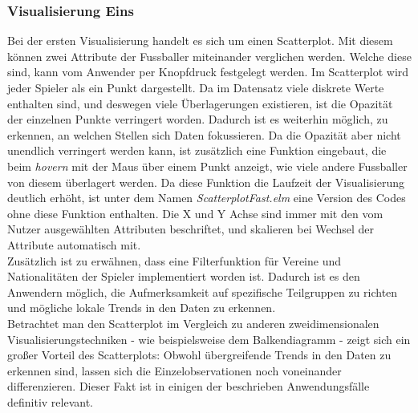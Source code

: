 \documentclass[usegeometry=true]{scrartcl}
\begin{document}
\subsubsection{Visualisierung Eins}
Bei der ersten Visualisierung handelt es sich um einen Scatterplot.
Mit diesem können zwei Attribute der Fussballer miteinander verglichen werden. Welche diese sind, kann vom Anwender per Knopfdruck festgelegt werden. Im Scatterplot wird jeder Spieler als ein Punkt dargestellt. Da im Datensatz viele diskrete Werte enthalten sind, und deswegen viele Überlagerungen existieren, ist die Opazität der einzelnen Punkte verringert worden. Dadurch ist es weiterhin möglich, zu erkennen, an welchen Stellen sich Daten fokussieren. Da die Opazität aber nicht unendlich verringert werden kann, ist zusätzlich eine Funktion eingebaut, die beim \textit{hovern} mit der Maus über einem Punkt anzeigt, wie viele andere Fussballer von diesem überlagert werden. Da diese Funktion die Laufzeit der Visualisierung deutlich erhöht, ist unter dem Namen \textit{ScatterplotFast.elm} eine Version des Codes ohne diese Funktion enthalten. Die X und Y Achse sind immer mit den vom Nutzer ausgewählten Attributen beschriftet, und skalieren bei Wechsel der Attribute automatisch mit.\\
Zusätzlich ist zu erwähnen, dass eine Filterfunktion für Vereine und Nationalitäten der Spieler implementiert worden ist. Dadurch ist es den Anwendern möglich, die Aufmerksamkeit auf spezifische Teilgruppen zu richten und mögliche lokale Trends in den Daten zu erkennen.\\
Betrachtet man den Scatterplot im Vergleich zu anderen zweidimensionalen Visualisierungstechniken - wie beispielsweise dem Balkendiagramm - zeigt sich ein großer Vorteil des Scatterplots: Obwohl übergreifende Trends in den Daten zu erkennen sind, lassen sich die Einzelobservationen noch voneinander differenzieren. Dieser Fakt ist in einigen der beschrieben Anwendungsfälle definitiv relevant.
\end{document}
